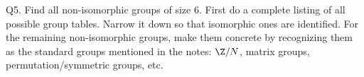 \SOLUTION



\newpage
Q5. Find all non-isomorphic groups of size 6.
First do a complete listing of all possible group tables.
Narrow it down so that isomorphic ones are identified.
For the remaining non-isomorphic groups, make them concrete
by recognizing them as the standard groups mentioned in the notes:
$\Z/N$, matrix groups, permutation/symmetric groups, etc.

\SOLUTION





